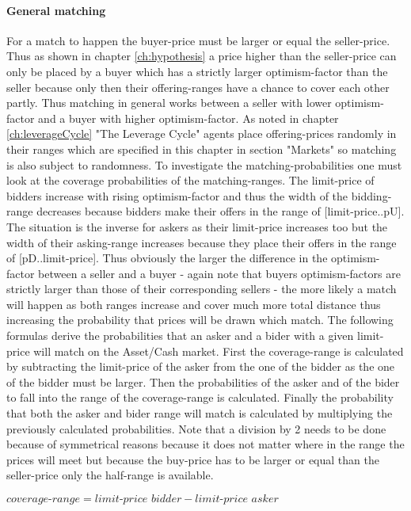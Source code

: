 \documentclass[Bachelorarbeit.tex]{subfiles}
\begin{document}
\paragraph{General matching}
For a match to happen the buyer-price must be larger or equal the seller-price. Thus as shown in chapter \ref{ch:hypothesis} a price higher than the seller-price can only be placed by a buyer which has a strictly larger optimism-factor than the seller because only then their offering-ranges have a chance to cover each other partly. Thus matching in general works between a seller with lower optimism-factor and a buyer with higher optimism-factor. As noted in chapter \ref{ch:leverageCycle} "The Leverage Cycle" agents place offering-prices randomly in their ranges which are specified in this chapter in section "Markets" so matching is also subject to randomness.
\medskip
To investigate the matching-probabilities one must look at the coverage probabilities of the matching-ranges. The limit-price of bidders increase with rising optimism-factor and thus the width of the bidding-range decreases because bidders make their offers in the range of [limit-price..pU]. The situation is the inverse for askers as their limit-price increases too but the width of their asking-range increases because they place their offers in the range of [pD..limit-price]. Thus obviously the larger the difference in the optimism-factor between a seller and a buyer - again note that buyers optimism-factors are strictly larger than those of their corresponding sellers - the more likely a match will happen as both ranges increase and cover much more total distance thus increasing the probability that prices will be drawn which match.
\medskip
The following formulas derive the probabilities that an asker and a bider with a given limit-price will match on the Asset/Cash market. First the coverage-range is calculated by subtracting the limit-price of the asker from the one of the bidder as the one of the bidder must be larger. Then the probabilities of the asker and of the bider to fall into the range of the coverage-range is calculated. Finally the probability that both the asker and bider range will match is calculated by multiplying the previously calculated probabilities. Note that a division by 2 needs to be done because of symmetrical reasons because it does not matter where in the range the prices will meet but because the buy-price has to be larger or equal than the seller-price only the half-range is available.

\begin{center}
$\textit{coverage-range} = \textit{limit-price bidder} - \textit{limit-price asker}$
\end{center}
\end{document}
